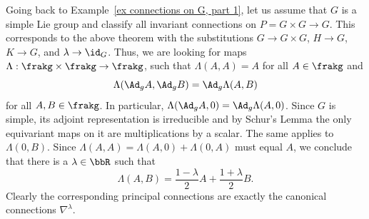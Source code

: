 \begin{example}\label{ex connections on G, part 6}
    Going back to Example~\ref{ex connections on G, part 1}, 
    let us assume that $G$ is a simple Lie group and classify all invariant connections on $P=G\times G\to G$. This corresponds to the above theorem with the substitutions $G\to G\times G$, $H\to G$, $K\to G$, and $\lambda\to\id_G$. Thus, we are looking for maps  $\Lambda:\frakg\times\frakg\to\frakg$, such that $\Lambda(A,A)=A$ for all $A\in\frakg$ and 
    \[\Lambda(\Ad_{g} A,\Ad_{g}B)=\Ad_g\Lambda(A,B)\]
    for all $A,B\in\frakg$. In particular, $\Lambda(\Ad_g A,0)=\Ad_g \Lambda(A,0)$. Since $G$ is simple, its adjoint representation is irreducible and by Schur's Lemma the only equivariant maps on it are multiplications by a scalar. The same applies to $\Lambda(0,B)$. Since $\Lambda(A,A)=\Lambda(A,0)+\Lambda(0,A)$ must equal $A$, we conclude that there is a $\lambda\in\bbR$ such that 
    \[\Lambda(A,B)=\frac{1-\lambda}{2}A+\frac{1+\lambda}{2}B.\]
    Clearly the corresponding principal connections are exactly the canonical connections $\nabla^\lambda$.

\end{example}



